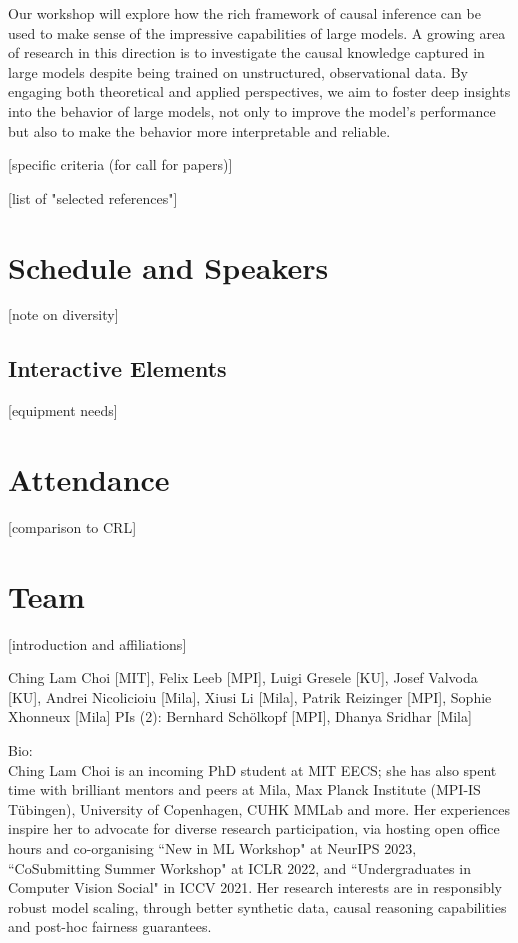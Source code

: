 \documentclass{article}
\begin{document}
Our workshop will explore how the rich framework of causal inference can be used to make sense of the impressive capabilities of large models. 
A growing area of research in this direction is to investigate the causal knowledge captured in large models despite being trained on unstructured, observational data. 
By engaging both theoretical and applied perspectives, we aim to foster deep insights into the behavior of large models, not only to improve the model's performance but also to make the behavior more interpretable and reliable.

[specific criteria (for call for papers)]

[list of "selected references"]

\section{Schedule and Speakers}

[note on diversity]

\subsection{Interactive Elements}

[equipment needs]

\section{Attendance}

[comparison to CRL]

\section{Team}

[introduction and affiliations]

Ching Lam Choi [MIT], Felix Leeb [MPI], Luigi Gresele [KU], Josef Valvoda [KU],  Andrei Nicolicioiu [Mila], Xiusi Li [Mila], Patrik Reizinger [MPI], Sophie Xhonneux [Mila]
PIs (2): Bernhard Schölkopf [MPI], Dhanya Sridhar [Mila]

Bio:\\

Ching Lam Choi is an incoming PhD student at MIT EECS; she has also spent time with brilliant mentors and peers at Mila, Max Planck Institute (MPI-IS Tübingen), University of Copenhagen, CUHK MMLab and more. Her experiences inspire her to advocate for diverse research participation, via hosting open office hours and co-organising ``New in ML Workshop" at NeurIPS 2023, ``CoSubmitting Summer Workshop" at ICLR 2022, and ``Undergraduates in Computer Vision Social" in ICCV 2021. Her research interests are in responsibly robust model scaling, through better synthetic data, causal reasoning capabilities and post-hoc fairness guarantees.
\end{document}
